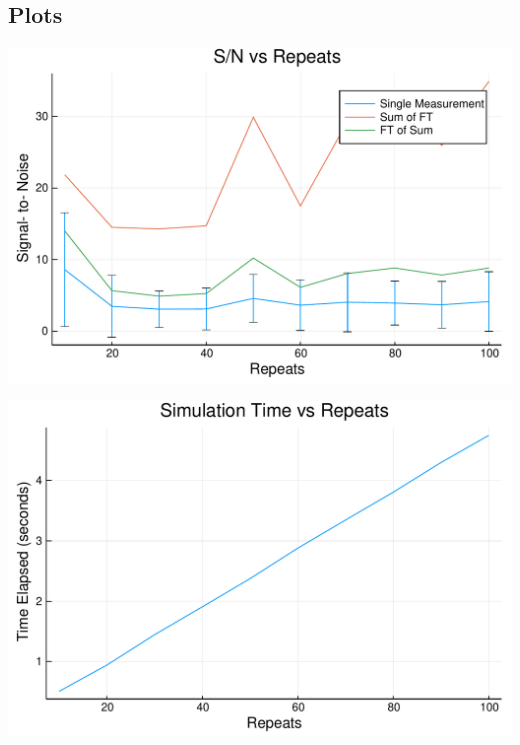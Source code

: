 \documentclass[12pt,a4paper]{article}
\begin{document}
\subsection{Plots}

\includegraphics[width=\linewidth]{jl_PKMVtA/simnb_15_1.pdf}

\includegraphics[width=\linewidth]{jl_PKMVtA/simnb_16_1.pdf}
\end{document}
